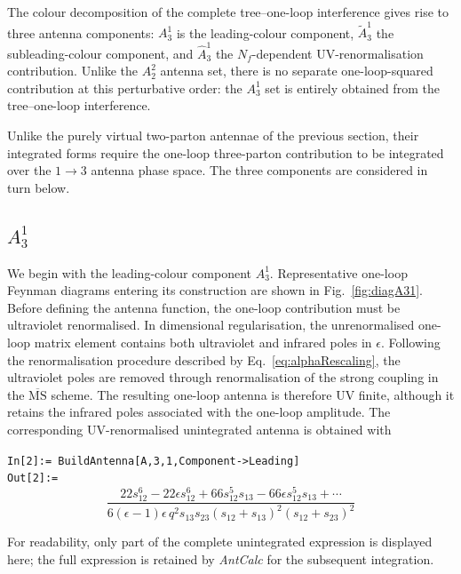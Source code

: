 The colour decomposition of the complete tree--one-loop interference gives rise to
three antenna components: $A_3^1$ is the leading-colour component, $\tilde A_3^1$
the subleading-colour component, and $\hat A_3^1$ the $N_f$-dependent
UV-renormalisation contribution. Unlike the $A_2^2$ antenna set, there is no
separate one-loop-squared contribution at this perturbative order: the $A_3^1$ set
is entirely obtained from the tree--one-loop interference.

Unlike the purely virtual two-parton antennae of the previous section, their integrated forms
require the one-loop three-parton contribution to be integrated over the $1\to3$ antenna phase space.
The three components are considered in turn below.



\subsection{$A_3^1$}\label{subsec:A31lead}

We begin with the leading-colour component $A_3^1$.
Representative one-loop Feynman diagrams entering its construction are shown in Fig.~\ref{fig:diagA31}.
Before defining the antenna function, the one-loop contribution must be ultraviolet
renormalised. In dimensional regularisation, the unrenormalised one-loop matrix
element contains both ultraviolet and infrared poles in $\epsilon$. Following the
renormalisation procedure described by Eq.~\eqref{eq:alphaRescaling}, the ultraviolet
poles are removed through renormalisation of the strong coupling in the
$\overline{\mathrm{MS}}$ scheme. The resulting one-loop antenna is therefore UV
finite, although it retains the infrared poles associated with the one-loop amplitude.
The corresponding UV-renormalised unintegrated antenna is obtained with

\begin{mdframed}[backgroundcolor=gray!10, linewidth=0pt]
\texttt{In[2]:= BuildAntenna[A,3,1,Component->Leading]}\\
\hfill
\texttt{Out[2]:=}
    \begin{equation*}
        \frac{22s_{12}^6-22\epsilon s_{12}^6+66s_{12}^5s_{13}-66\epsilon s_{12}^5s_{13}+\cdots}{6(\epsilon-1)\epsilon\,q^2s_{13}s_{23}(s_{12}+s_{13})^2(s_{12}+s_{23})^2}
    \end{equation*}
\end{mdframed}
For readability, only part of the complete unintegrated expression is displayed here;
the full expression is retained by \textit{AntCalc} for the subsequent integration.

